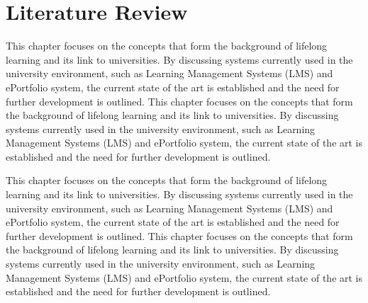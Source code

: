 \chapter{Literature Review \label{cha:litrev}}

This chapter focuses on the concepts that form the background of lifelong
learning and its link to universities. By discussing systems currently used in
the university environment, such as Learning Management Systems (LMS) and
ePortfolio system, the current state of the art is established and the need for
further development is outlined. This chapter focuses on the concepts that form
the background of lifelong learning and its link to universities. By discussing
systems currently used in the university environment, such as Learning
Management Systems (LMS) and ePortfolio system, the current state of the art is
established and the need for further development is outlined.

This chapter focuses on the concepts that form the background of lifelong
learning and its link to universities. By discussing systems currently used in
the university environment, such as Learning Management Systems (LMS) and
ePortfolio system, the current state of the art is established and the need for
further development is outlined. This chapter focuses on the concepts that form
the background of lifelong learning and its link to universities. By discussing
systems currently used in the university environment, such as Learning
Management Systems (LMS) and ePortfolio system, the current state of the art is
established and the need for further development is outlined.

